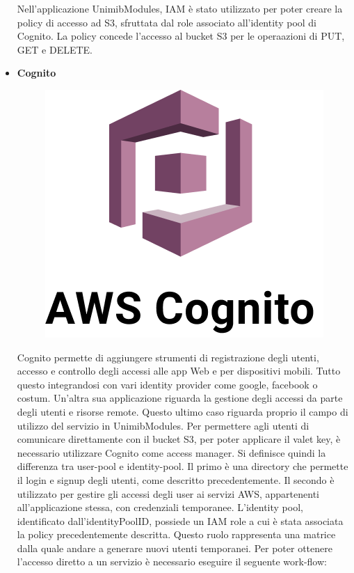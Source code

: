 \documentclass[12pt]{article}
\begin{document}
\begin{itemize}
\begin{figure}[H]
\end{figure}
Nell'applicazione UnimibModules, IAM è stato utilizzato per poter creare la policy di accesso ad S3, sfruttata dal role associato all'identity pool di Cognito. La policy concede l'accesso al bucket S3 per le operaazioni di PUT, GET e DELETE.
\item \textbf{Cognito}
\begin{figure}[H]
\includegraphics[scale=0.2, left]{cognito.png}
\end{figure}
Cognito permette di aggiungere strumenti di registrazione degli utenti, accesso e controllo degli accessi alle app Web e per dispositivi mobili. Tutto questo integrandosi con vari identity provider come google, facebook o costum. Un'altra sua applicazione riguarda la gestione degli accessi da parte degli utenti e risorse remote. Questo ultimo caso riguarda proprio il campo di utilizzo del servizio in UnimibModules. Per permettere agli utenti di comunicare direttamente con il bucket S3, per poter applicare il valet key, è necessario utilizzare Cognito come access manager. Si definisce quindi la differenza tra user-pool e identity-pool. Il primo è una directory che permette il login e signup degli utenti, come descritto precedentemente. Il secondo è utilizzato per gestire gli accessi  degli user  ai servizi AWS, appartenenti all'applicazione stessa, con credenziali temporanee. L'identity pool, identificato dall'identityPoolID, possiede un IAM role a cui è stata associata la policy precedentemente descritta. Questo ruolo rappresenta una matrice dalla quale andare a generare nuovi utenti temporanei. Per poter ottenere l'accesso diretto a un servizio è necessario eseguire il seguente work-flow:

\end{itemize}
\end{document}
